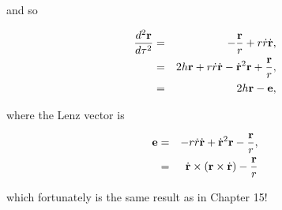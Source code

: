 and so

\begin{eqnarray}
{d^2{\bf r}\over d\tau^2} &=& -{{\bf r}\over r} + r\dot r\dot{{\bf r}}, \\
&=& 2h{\bf r} + r\dot r\dot{{\bf r}} - \dot{{\bf r}}^2{\bf r} + {{\bf r}\over r}, \\
&=& 2h{\bf r} - {\bf e},
\end{eqnarray}

where the Lenz vector is 

\begin{eqnarray}
{\bf e} &=&  - r\dot r\dot{{\bf r}} + \dot{{\bf r}}^2{\bf r} - {{\bf r}\over r}, \\
&=& \dot{{\bf r}}\times({\bf r}\times\dot{{\bf r}}) - {{\bf r}\over r}
\end{eqnarray}

which fortunately is the same result as in Chapter 15!
